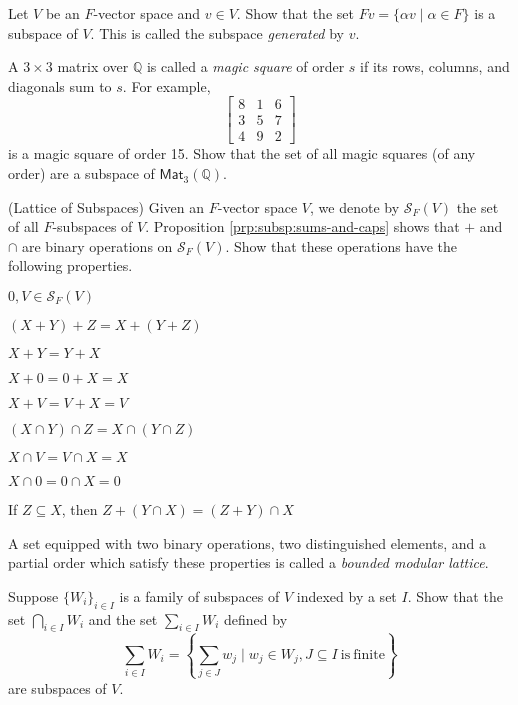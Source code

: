 \begin{exercises}
\item Let $V$ be an $F$-vector space and $v \in V$. Show that the set $Fv = \{\alpha v \mid \alpha \in F\}$ is a subspace of $V$. This is called the subspace \emph{generated} by $v$.

\item A $3 \times 3$ matrix over $\mathbb{Q}$ is called a \emph{magic square} of order $s$ if its rows, columns, and diagonals sum to $s$. For example, \[\left[\begin{array}{ccc} 8 & 1 & 6 \\ 3 & 5 & 7 \\ 4 & 9 & 2 \end{array}\right]\] is a magic square of order 15. Show that the set of all magic squares (of any order) are a subspace of $\mathsf{Mat}_3(\mathbb{Q})$.

\item{\label{exr:latt-of-subsp}}
(Lattice of Subspaces) Given an $F$-vector space $V$, we denote by $\mathcal{S}_F(V)$ the set of all $F$-subspaces of $V$. Proposition \ref{prp:subsp:sums-and-caps} shows that $+$ and $\cap$ are binary operations on $\mathcal{S}_F(V)$. Show that these operations have the following properties.
\begin{enumerate*}
\item $0,V \in \mathcal{S}_F(V)$
\item $(X+Y)+Z = X+(Y+Z)$
\item $X+Y = Y+X$
\item $X+0 = 0+X = X$
\item $X+V = V+X = V$
\item $(X \cap Y) \cap Z = X \cap (Y \cap Z)$
\item $X \cap V = V \cap X = X$
\item $X \cap 0 = 0 \cap X = 0$
\item If $Z \subseteq X$, then $Z + (Y \cap X) = (Z + Y) \cap X$
\end{enumerate*}
A set equipped with two binary operations, two distinguished elements, and a partial order which satisfy these properties is called a \emph{bounded modular lattice}.

\item{\label{exr:arb-ints-and-sums-of-subsp}}
Suppose $\{W_i\}_{i \in I}$ is a family of subspaces of $V$ indexed by a set $I$. Show that the set $\bigcap_{i \in I} W_i$ and the set $\sum_{i \in I} W_i$ defined by \[\sum_{i \in I} W_i = \left\{ \sum_{j \in J} w_j \mid w_j \in W_j, J \subseteq I\ \mathrm{is\ finite} \right\}\] are subspaces of $V$.
\end{exercises}